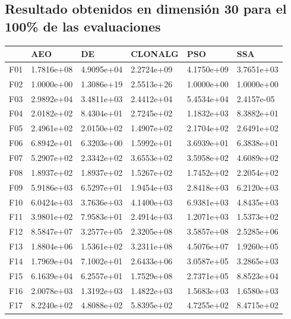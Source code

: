 \documentclass[10pt,a4paper]{article}
\begin{document}
	\subsection{Resultado obtenidos en dimensión 30 para el 100\% de las evaluaciones}
	\begin{table}[H]
	\begin{center}
	\begin{tabular}{llllll}
		
		\toprule
		{} &         AEO &          DE &       CLONALG &         PSO &         SSA \\
		\midrule
		F01  &  1.7816e+08 &  4.9095e+04 &  2.2724e+09 &  4.1750e+09 &  3.7651e+03 \\
		F02  &  1.0000e+00 &  1.3086e+19 &  2.5513e+26 &  1.0000e+00 &  1.0000e+00 \\
		F03  &  2.9892e+04 &  3.4811e+03 &  2.4412e+04 &  5.4534e+04 &  2.4157e-05 \\
		F04  &  2.0182e+02 &  8.4304e+01 &  2.7245e+02 &  1.1832e+03 &  8.3882e+01 \\
		F05  &  2.4961e+02 &  2.0150e+02 &  1.4907e+02 &  2.1704e+02 &  2.6491e+02 \\
		F06  &  6.8942e+01 &  6.3203e+00 &  1.5992e+01 &  3.6939e+01 &  6.3838e+01 \\
		F07  &  5.2907e+02 &  2.3342e+02 &  3.6553e+02 &  3.5958e+02 &  4.6089e+02 \\
		F08  &  1.8937e+02 &  1.8937e+02 &  1.5267e+02 &  1.7452e+02 &  2.2054e+02 \\
		F09  &  5.9186e+03 &  6.5297e+01 &  1.9454e+03 &  2.8418e+03 &  6.2120e+03 \\
		F10  &  6.0424e+03 &  3.7636e+03 &  4.1400e+03 &  6.9381e+03 &  4.8435e+03 \\
		F11  &  3.9801e+02 &  7.9583e+01 &  2.4914e+03 &  1.2071e+03 &  1.5373e+02 \\
		F12  &  8.5847e+07 &  3.2577e+05 &  2.3205e+08 &  3.5857e+08 &  2.5285e+06 \\
		F13  &  1.8804e+06 &  1.5361e+02 &  3.2311e+08 &  4.5076e+07 &  1.9260e+05 \\
		F14  &  1.7969e+04 &  7.1002e+01 &  2.6433e+06 &  3.0587e+05 &  3.2865e+03 \\
		F15  &  6.1639e+04 &  6.2557e+01 &  1.7529e+08 &  2.7371e+05 &  8.8523e+04 \\
		F16  &  2.0078e+03 &  1.3192e+03 &  1.4822e+03 &  1.5683e+03 &  1.6580e+03 \\
		F17  &  8.2240e+02 &  4.8088e+02 &  5.8395e+02 &  4.7255e+02 &  8.4715e+02 \\

\end{tabular}
\end{center}
\end{table}
\end{document}
